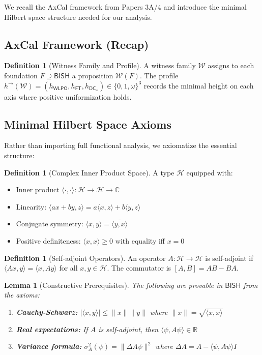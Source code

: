 \documentclass[11pt]{article}
\newcommand{\WLPO}{\mathsf{WLPO}}
\newcommand{\FT}{\mathsf{FT}}
\newcommand{\DCw}{\mathsf{DC}_{\omega}}
\newcommand{\BISH}{\mathsf{BISH}}
\newcommand{\leanok}{\text{\tiny [✓ Lean]}}
\newcommand{\R}{\mathbb{R}}
\newcommand{\C}{\mathbb{C}}
\newcommand{\Hil}{\mathcal{H}}
\newcommand{\ip}[2]{\langle #1, #2 \rangle}
\newcommand{\comm}[2]{[#1, #2]}
\newcommand{\stddev}{\sigma}
\theoremstyle{plain}
\newtheorem{lemma}[theorem]{Lemma}
\theoremstyle{definition}
\newtheorem{definition}[theorem]{Definition}
\theoremstyle{remark}
\begin{document}
We recall the AxCal framework from Papers 3A/4 and introduce the minimal Hilbert space structure needed for our analysis.

\subsection{AxCal Framework (Recap)}

\begin{definition}[Witness Family and Profile]
A witness family $\mathcal{W}$ assigns to each foundation $F \supseteq \BISH$ a proposition $\mathcal{W}(F)$. 
The profile $h^{\to}(\mathcal{W}) = (h_{\WLPO}, h_{\FT}, h_{\DCw}) \in \{0,1,\omega\}^3$ records the minimal height on each axis where positive uniformization holds.
\end{definition}

\subsection{Minimal Hilbert Space Axioms}

Rather than importing full functional analysis, we axiomatize the essential structure:

\begin{definition}[Complex Inner Product Space] 
A type $\Hil$ equipped with:
\begin{itemize}
\item Inner product $\ip{\cdot}{\cdot}: \Hil \to \Hil \to \C$ 
\item Linearity: $\ip{ax + by}{z} = a\ip{x}{z} + b\ip{y}{z}$
\item Conjugate symmetry: $\ip{x}{y} = \overline{\ip{y}{x}}$
\item Positive definiteness: $\ip{x}{x} \geq 0$ with equality iff $x = 0$
\end{itemize}
\end{definition}

\begin{definition}[Self-adjoint Operators]
An operator $A: \Hil \to \Hil$ is self-adjoint if $\ip{Ax}{y} = \ip{x}{Ay}$ for all $x,y \in \Hil$.
The commutator is $\comm{A}{B} = AB - BA$.
\end{definition}

\begin{lemma}[Constructive Prerequisites] \leanok
The following are provable in $\BISH$ from the axioms:
\begin{enumerate}
\item \textbf{Cauchy-Schwarz:} $|\ip{x}{y}| \leq \|x\| \|y\|$ where $\|x\| = \sqrt{\ip{x}{x}}$
\item \textbf{Real expectations:} If $A$ is self-adjoint, then $\ip{\psi}{A\psi} \in \R$
\item \textbf{Variance formula:} $\stddev_A^2(\psi) = \|\Delta A \psi\|^2$ where $\Delta A = A - \ip{\psi}{A\psi} I$
\end{enumerate}
\end{lemma}
\end{document}
